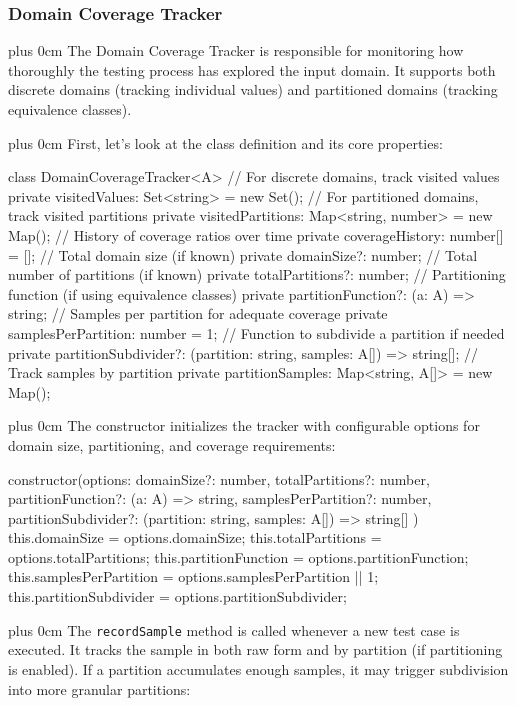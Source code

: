 \documentclass[11pt,a4paper]{article}
\newcommand{\justifytext}{\leftskip=0pt \rightskip=0pt plus 0cm}
\begin{document}
\subsubsection{Domain Coverage Tracker}

\justifytext
The Domain Coverage Tracker is responsible for monitoring how thoroughly the testing process has explored the input domain. It supports both discrete domains (tracking individual values) and partitioned domains (tracking equivalence classes).

\justifytext
First, let's look at the class definition and its core properties:

\begin{wrappedcode}
class DomainCoverageTracker<A> {
  // For discrete domains, track visited values
  private visitedValues: Set<string> = new Set();
  // For partitioned domains, track visited partitions
  private visitedPartitions: Map<string, number> = new Map();
  // History of coverage ratios over time
  private coverageHistory: number[] = [];
  // Total domain size (if known)
  private domainSize?: number;
  // Total number of partitions (if known)
  private totalPartitions?: number;
  // Partitioning function (if using equivalence classes)
  private partitionFunction?: (a: A) => string;
  // Samples per partition for adequate coverage
  private samplesPerPartition: number = 1;
  // Function to subdivide a partition if needed
  private partitionSubdivider?: (partition: string, samples: A[]) => string[];
  // Track samples by partition
  private partitionSamples: Map<string, A[]> = new Map();
}
\end{wrappedcode}

\justifytext
The constructor initializes the tracker with configurable options for domain size, partitioning, and coverage requirements:

\begin{wrappedcode}
  constructor(options: {
    domainSize?: number,
    totalPartitions?: number,
    partitionFunction?: (a: A) => string,
    samplesPerPartition?: number,
    partitionSubdivider?: (partition: string, samples: A[]) => string[]
  }) {
    this.domainSize = options.domainSize;
    this.totalPartitions = options.totalPartitions;
    this.partitionFunction = options.partitionFunction;
    this.samplesPerPartition = options.samplesPerPartition || 1;
    this.partitionSubdivider = options.partitionSubdivider;
  }
\end{wrappedcode}

\justifytext
The \texttt{recordSample} method is called whenever a new test case is executed. It tracks the sample in both raw form and by partition (if partitioning is enabled). If a partition accumulates enough samples, it may trigger subdivision into more granular partitions:
\end{document}
